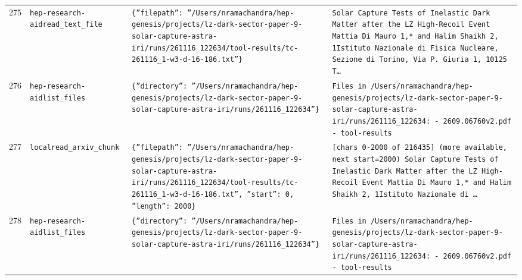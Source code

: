 \documentclass[11pt,a4paper]{article}
\begin{document}
\begin{longtable}{@{}p{}p{}p{}p{}@{}}
275 & \texttt{hep-research-aid}\newline\texttt{read\_\allowbreak{}text\_\allowbreak{}file} & \texttt{\{''filepath'':\allowbreak{} ''/\allowbreak{}Users/\allowbreak{}nramachandra/\allowbreak{}hep-genesis/\allowbreak{}projects/\allowbreak{}lz-dark-sector-paper-9-solar-capture-astra-iri/\allowbreak{}runs/\allowbreak{}261116\_\allowbreak{}122634/\allowbreak{}tool-results/\allowbreak{}tc-261116\_\allowbreak{}1-w3-d-16-186.txt''\}\allowbreak{}} & \texttt{Solar Capture Tests of Inelastic Dark Matter after the LZ High-Recoil Event Mattia Di Mauro 1,\allowbreak{}* and Halim Shaikh 2,\allowbreak{}\dag{}\allowbreak{} 1Istituto Nazionale di Fisica Nucleare,\allowbreak{} Sezione di Torino,\allowbreak{} Via P. Giuria 1,\allowbreak{} 10125 T\ldots{}\allowbreak{}} \\
276 & \texttt{hep-research-aid}\newline\texttt{list\_\allowbreak{}files} & \texttt{\{''directory'':\allowbreak{} ''/\allowbreak{}Users/\allowbreak{}nramachandra/\allowbreak{}hep-genesis/\allowbreak{}projects/\allowbreak{}lz-dark-sector-paper-9-solar-capture-astra-iri/\allowbreak{}runs/\allowbreak{}261116\_\allowbreak{}122634''\}\allowbreak{}} & \texttt{Files in /\allowbreak{}Users/\allowbreak{}nramachandra/\allowbreak{}hep-genesis/\allowbreak{}projects/\allowbreak{}lz-dark-sector-paper-9-solar-capture-astra-iri/\allowbreak{}runs/\allowbreak{}261116\_\allowbreak{}122634:\allowbreak{}   - 2609.06760v2.pdf   - tool-results} \\
277 & \texttt{local}\newline\texttt{read\_\allowbreak{}arxiv\_\allowbreak{}chunk} & \texttt{\{''filepath'':\allowbreak{} ''/\allowbreak{}Users/\allowbreak{}nramachandra/\allowbreak{}hep-genesis/\allowbreak{}projects/\allowbreak{}lz-dark-sector-paper-9-solar-capture-astra-iri/\allowbreak{}runs/\allowbreak{}261116\_\allowbreak{}122634/\allowbreak{}tool-results/\allowbreak{}tc-261116\_\allowbreak{}1-w3-d-16-186.txt'',\allowbreak{} ''start'':\allowbreak{} 0,\allowbreak{} ''length'':\allowbreak{} 2000\}\allowbreak{}} & \texttt{[chars 0-2000 of 216435]\allowbreak{} (more available,\allowbreak{} next start=\allowbreak{}2000)\allowbreak{}  Solar Capture Tests of Inelastic Dark Matter after the LZ High-Recoil Event Mattia Di Mauro 1,\allowbreak{}* and Halim Shaikh 2,\allowbreak{}\dag{}\allowbreak{} 1Istituto Nazionale di \ldots{}\allowbreak{}} \\
278 & \texttt{hep-research-aid}\newline\texttt{list\_\allowbreak{}files} & \texttt{\{''directory'':\allowbreak{} ''/\allowbreak{}Users/\allowbreak{}nramachandra/\allowbreak{}hep-genesis/\allowbreak{}projects/\allowbreak{}lz-dark-sector-paper-9-solar-capture-astra-iri/\allowbreak{}runs/\allowbreak{}261116\_\allowbreak{}122634''\}\allowbreak{}} & \texttt{Files in /\allowbreak{}Users/\allowbreak{}nramachandra/\allowbreak{}hep-genesis/\allowbreak{}projects/\allowbreak{}lz-dark-sector-paper-9-solar-capture-astra-iri/\allowbreak{}runs/\allowbreak{}261116\_\allowbreak{}122634:\allowbreak{}   - 2609.06760v2.pdf   - tool-results} \\

\end{longtable}
\end{document}

